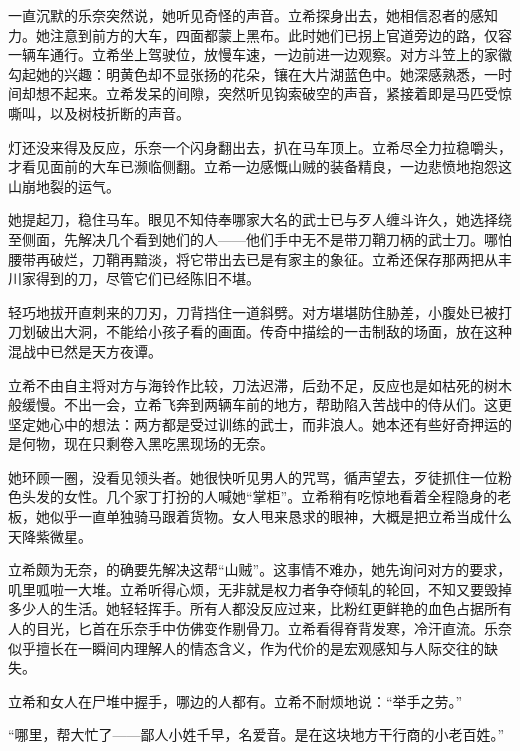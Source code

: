 \documentclass{article}
\begin{document}
一直沉默的乐奈突然说，她听见奇怪的声音。立希探身出去，她相信忍者的感知力。她注意到前方的大车，四面都蒙上黑布。此时她们已拐上官道旁边的路，仅容一辆车通行。立希坐上驾驶位，放慢车速，一边前进一边观察。对方斗笠上的家徽勾起她的兴趣：明黄色却不显张扬的花朵，镶在大片湖蓝色中。她深感熟悉，一时间却想不起来。立希发呆的间隙，突然听见钩索破空的声音，紧接着即是马匹受惊嘶叫，以及树枝折断的声音。



灯还没来得及反应，乐奈一个闪身翻出去，扒在马车顶上。立希尽全力拉稳嚼头，才看见面前的大车已濒临侧翻。立希一边感慨山贼的装备精良，一边悲愤地抱怨这山崩地裂的运气。



她提起刀，稳住马车。眼见不知侍奉哪家大名的武士已与歹人缠斗许久，她选择绕至侧面，先解决几个看到她们的人——他们手中无不是带刀鞘刀柄的武士刀。哪怕腰带再破烂，刀鞘再黯淡，将它带出去已是有家主的象征。立希还保存那两把从丰川家得到的刀，尽管它们已经陈旧不堪。



轻巧地拔开直刺来的刀刃，刀背挡住一道斜劈。对方堪堪防住胁差，小腹处已被打刀划破出大洞，不能给小孩子看的画面。传奇中描绘的一击制敌的场面，放在这种混战中已然是天方夜谭。



立希不由自主将对方与海铃作比较，刀法迟滞，后劲不足，反应也是如枯死的树木般缓慢。不出一会，立希飞奔到两辆车前的地方，帮助陷入苦战中的侍从们。这更坚定她心中的想法：两方都是受过训练的武士，而非浪人。她本还有些好奇押运的是何物，现在只剩卷入黑吃黑现场的无奈。



她环顾一圈，没看见领头者。她很快听见男人的咒骂，循声望去，歹徒抓住一位粉色头发的女性。几个家丁打扮的人喊她“掌柜”。立希稍有吃惊地看着全程隐身的老板，她似乎一直单独骑马跟着货物。女人甩来恳求的眼神，大概是把立希当成什么天降紫微星。



立希颇为无奈，的确要先解决这帮“山贼”。这事情不难办，她先询问对方的要求，叽里呱啦一大堆。立希听得心烦，无非就是权力者争夺倾轧的轮回，不知又要毁掉多少人的生活。她轻轻挥手。所有人都没反应过来，比粉红更鲜艳的血色占据所有人的目光，匕首在乐奈手中仿佛变作剔骨刀。立希看得脊背发寒，冷汗直流。乐奈似乎擅长在一瞬间内理解人的情态含义，作为代价的是宏观感知与人际交往的缺失。



立希和女人在尸堆中握手，哪边的人都有。立希不耐烦地说：“举手之劳。”



“哪里，帮大忙了——鄙人小姓千早，名爱音。是在这块地方干行商的小老百姓。”
\end{document}
